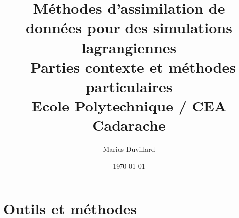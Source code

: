 \documentclass[a4paper]{report}
\title{
{Méthodes d'assimilation de données pour des simulations lagrangiennes \\\
Parties contexte et méthodes particulaires}\\
{\large Ecole Polytechnique / CEA Cadarache}
}
\author{Marius Duvillard}
\date{\today}
\begin{document}
\maketitle
\tableofcontents




\chapter{Outils et méthodes}


\printbibliography[heading=bibintoc]
% 
\end{document}
